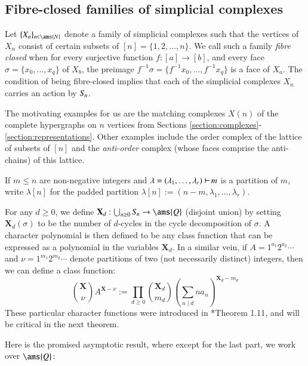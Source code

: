 \documentclass[matann2]{svjour1}
\def\N{\ams{N}}
\def\Q{\ams{Q}}
\def\symn{S_{\kern-1pt n}}
\def\ss{\sigma}
\def\partition{\,\,\begin{tikzpicture}
\draw[line width=0.7pt](0,0)--(0,0.2);
\draw[line width=0.7pt](0,0.1)--(0.175,0.1);
\end{tikzpicture}\,}
\newcommand{\Sym}[1]{S_{\kern-1pt {#1}}}
\begin{document}
\subsection{Fibre-closed families of simplicial complexes}

Let $\{X_n\}_{n \in \N}$ denote a family of simplicial complexes
such that the vertices of $X_n$ consist of
certain subsets of $[n]=\{1,2,\ldots,n\}$. %
We call such a 
family \emph{fibre closed} when for every surjective function
$f:[a] \rightarrow [b]$, and every face
$\ss = \{x_0,\ldots,x_q\}$ of $X_b$, the preimage
$f^{-1}\ss = \{f^{-1}x_0,\ldots,f^{-1}x_q\}$ is a
face of $X_a$.
The condition of being fibre-closed
implies that each of the simplicial complexes $X_n$
carries an action by $\symn$.

The motivating examples for us are the matching complexes $X(n)$
of the complete hypergraphs on $n$ vertices from Sections
\ref{section:complexes}-\ref{section:representations}.
Other examples include the order complex of the lattice of subsets
of $[n]$ and the \emph{anti-order\/} complex (whose faces comprise the
anti-chains) of this lattice. 

If $m\leq n$ are non-negative integers and 
$\lambda = (\lambda_1,\ldots,\lambda_r)\partition m$ 
is a partition of $m$, write $\lambda[n]$ for the padded partition
$\lambda[n] := (n-m,\lambda_1,\ldots,\lambda_r)$.

For any $d \geq 0$, we define
$\mathbf{X}_d:\bigcup_{n \geq 0}\Sym{n}\rightarrow \Q$ (disjoint union) by setting
$\mathbf{X}_d(\sigma)$ to be the number of $d$-cycles in the cycle decomposition
of $\sigma$. A character polynomial is then defined to be any class
function that can be expressed as a polynomial in the variables $\mathbf{X}_d$.
In a similar vein, if $A = 1^{a_1}2^{a_2}\cdots$ and $\nu = 1^{m_1}2^{m_2}\cdots$
denote partitions of two (not necessarily distinct) integers,
then we can define a class function:
\[
\binom{\mathbf{X}}{\nu}A^{\mathbf{X}-\nu} := \prod_{d \geq 0}
\binom{\mathbf{X}_d}{m_d}\left(\sum_{n \mid d} na_n\right)^{\mathbf{X}_d-m_d}
\]
These particular character functions were introduced in
\cite{Tost1}*{Theorem 1.11}, and will be critical in the next theorem.

Here is the promised asymptotic result, where except for the last part,
we work over $\Q$:
 
\end{document}
